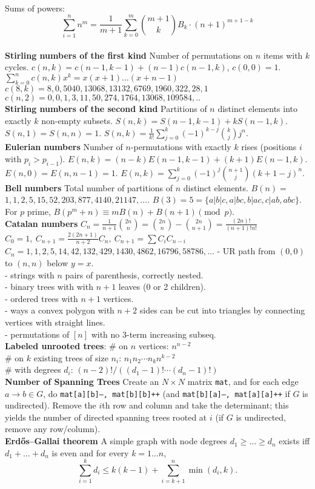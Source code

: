 Sums of powers: {\footnotesize \[ \sum_{i=1}^n n^m = \frac{1}{m+1} \sum_{k=0}^m \binom{m+1}{k} B_k \cdot (n+1)^{m+1-k} \] }\\
\textbf{Stirling numbers of the first kind} Number of permutations on $n$ items with $k$ cycles. $c(n,k) = c(n-1,k-1) + (n-1) c(n-1,k)$, $c(0,0) = 1$.$\sum_{k=0}^n c(n,k)x^k =$$x(x+1) \dots (x+n-1)$
{\footnotesize
$c(8,k) = 8, 0, 5040, 13068, 13132, 6769, 1960, 322, 28, 1$ \\
$c(n,2) = 0, 0, 1, 3, 11, 50, 274, 1764, 13068, 109584, ..$
}\\
\textbf{Stirling numbers of the second kind} Partitions of $n$ distinct elements into exactly $k$ non-empty subsets. $S(n,k) = S(n-1,k-1) + k S(n-1,k)$. $S(n,1) = S(n,n) = 1$. $S(n,k) = \frac{1}{k!}\sum_{j=0}^k (-1)^{k-j}\binom{k}{j}j^n$.\\
\textbf{Eulerian numbers} Number of $n$-permutations with exactly $k$ rises (positions $i$ with $p_i > p_{i-1}$). $E(n,k) = (n-k)E(n-1,k-1) + (k+1)E(n-1,k)$. $E(n,0) = E(n,n-1) = 1$. $E(n,k) = \sum_{j=0}^k(-1)^j\binom{n+1}{j}(k+1-j)^n$.\\
\textbf{Bell numbers} Total number of partitions of $n$ distinct elements. $B(n) =$ $1, 1, 2, 5, 15, 52, 203, 877, 4140, 21147, \dots$. $B(3) = 5 = \{a|b|c, a|bc, b|ac, c|ab, abc\}$. For $p$ prime, $B(p^m+n)\equiv mB(n)+B(n+1) \pmod{p}$.\\
\textbf{Catalan numbers}
$C_n=\frac{1}{n+1}\binom{2n}{n}= \binom{2n}{n}-\binom{2n}{n+1} = \frac{(2n)!}{(n+1)!n!}$\\
$C_0=1,\ C_{n+1} = \frac{2(2n+1)}{n+2}C_n,\ C_{n+1}=\sum C_iC_{n-i}$
${C_n = 1, 1, 2, 5, 14, 42, 132, 429, 1430, 4862, 16796, 58786, \dots}$
- UR path from $(0,0)$ to $(n,n)$ below $y=x$.\\
- strings with $n$ pairs of parenthesis, correctly nested.\\
- binary trees with with $n+1$ leaves (0 or 2 children).\\
- ordered trees with $n+1$ vertices.\\
- ways a convex polygon with $n+2$ sides can be cut into triangles by connecting vertices with straight lines.\\
- permutations of $[n]$ with no 3-term increasing subseq.\\
\textbf{Labeled unrooted trees}:
\# on $n$ vertices: $n^{n-2}$ \\
\# on $k$ existing trees of size $n_i$: $n_1n_2\cdots n_k n^{k-2}$ \\
\# with degrees $d_i$: $(n-2)! / ((d_1-1)! \cdots (d_n-1)!)$\\
\textbf{Number of Spanning Trees} Create an $N\times N$ matrix \texttt{mat}, and for each edge $a \rightarrow b \in G$, do \texttt{mat[a][b]--, mat[b][b]++} (and \texttt{mat[b][a]--, mat[a][a]++} if $G$ is undirected). Remove the $i$th row and column and take the determinant; this yields the number of directed spanning trees rooted at $i$ (if $G$ is undirected, remove any row/column).\\
\textbf{Erdős–Gallai theorem} A simple graph with node degrees $d_1 \ge \dots \ge d_n$ exists iff $d_1 + \dots + d_n$ is even and for every $k = 1\dots n$,
\[ \sum _{i=1}^{k}d_{i}\leq k(k-1)+\sum _{i=k+1}^{n}\min(d_{i},k). \]
